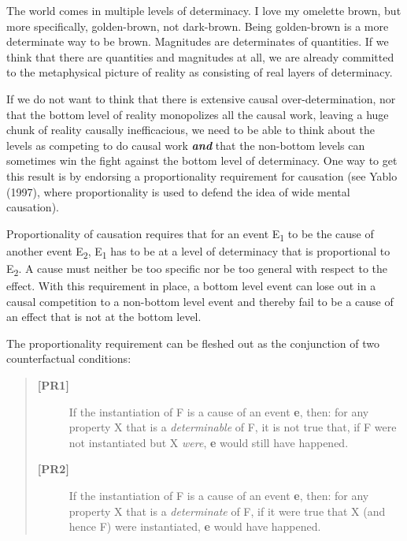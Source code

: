 \documentclass[a4paper,12pt]{article}
\begin{document}
The world comes in multiple levels of determinacy. I love my omelette brown, but more specifically, golden-brown, not dark-brown. Being golden-brown is a more determinate way to be brown. Magnitudes are determinates of quantities. If we think that there are quantities and magnitudes at all, we are already committed to the metaphysical picture of reality as consisting of real layers of determinacy.

If we do not want to think that there is extensive causal over-determination, nor that the bottom level of reality monopolizes all the causal work, leaving a huge chunk of reality causally inefficacious, we need to be able to think about the levels as competing to do causal work \emph{\textbf{and}} that the non-bottom levels can sometimes win the fight against the bottom level of determinacy. One way to get this result is by endorsing a proportionality requirement for causation (see Yablo (1997), where proportionality is used to defend the idea of wide mental causation).\footnotemark


Proportionality of causation requires that for an event E\textsubscript{1} to be the cause of another event E\textsubscript{2}, E\textsubscript{1} has to be at a level of determinacy that is proportional to E\textsubscript{2}. A cause must neither be too specific nor be too general with respect to the effect. With this requirement in place, a bottom level event can lose out in a causal competition to a non-bottom level event and thereby fail to be a cause of an effect that is not at the bottom level.

The proportionality requirement can be fleshed out as the conjunction of two counterfactual conditions:

\begin{quote}
\begin{description}
\item[\textbf{[PR1]}] If the instantiation of F is a cause of an event \textbf{e}, then: for any property X that is a \emph{determinable} of F, it is not true that, if F were not instantiated but X \emph{were}, \textbf{e} would still have happened.
\item[\textbf{[PR2]}] If the instantiation of F is a cause of an event \textbf{e}, then: for any property X that is a \emph{determinate} of F, if it were true that X (and hence F) were instantiated, \textbf{e} would have happened.
\end{description}
\end{quote}
\end{document}

